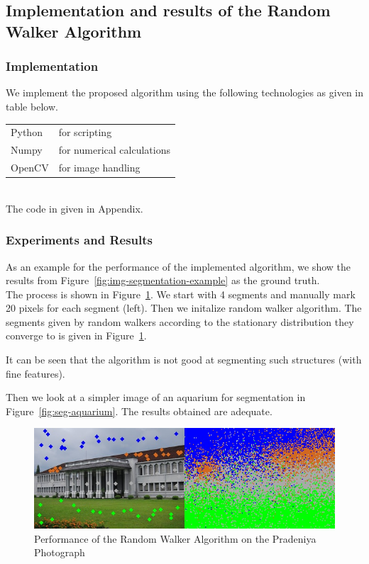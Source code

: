 \documentclass[a4paper]{article}
\newcommand\figref{Figure~\ref}
\begin{document}
\FloatBarrier
\subsection{Implementation and results of the Random Walker Algorithm}
\subsubsection{Implementation}
We implement the proposed algorithm using the following technologies as given in table below.\\
\begin{tabular}{|l|l|}
\hline
     Python & for scripting \\
     Numpy & for numerical calculations\\
     OpenCV & for image handling\\
\hline
\end{tabular}

\\The code in given in Appendix.

\subsubsection{Experiments and Results}

As an example for the performance of the implemented algorithm, we show the results from \figref{fig:img-segmentation-example} as the ground truth.\\

The process is shown  in \figref{fig:ran-20}. We start with 4 segments and manually mark 20 pixels for each segment (left). Then we initalize random walker algorithm. The segments given by random walkers according to the stationary distribution they converge to is given in \figref{fig:ran-20}. 

It can be seen that the algorithm is not good at segmenting such structures (with fine features).

Then we look at a simpler image of an aquarium for segmentation in \figref{fig:seg-aquarium}. The results obtained are adequate.
\begin{figure}
    \centering
    \includegraphics[width=\textwidth]{seg-20.jpg}
    \caption{Performance of the Random Walker Algorithm on the Pradeniya Photograph}
    \label{fig:ran-20}
\end{figure}
\end{document}
